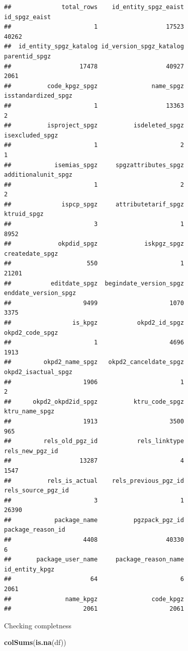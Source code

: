 \documentclass[
]{article}
\newenvironment{Shaded}{\begin{snugshade}}{\end{snugshade}}
\newcommand{\FunctionTok}[1]{\textcolor[rgb]{0.13,0.29,0.53}{\textbf{#1}}}
\newcommand{\NormalTok}[1]{#1}
\begin{document}
\begin{verbatim}
##              total_rows    id_entity_spgz_eaist           id_spgz_eaist 
##                       1                   17523                   40262 
##  id_entity_spgz_katalog id_version_spgz_katalog           parentid_spgz 
##                   17478                   40927                    2061 
##          code_kpgz_spgz               name_spgz     isstandardized_spgz 
##                       1                   13363                       2 
##          isproject_spgz          isdeleted_spgz         isexcluded_spgz 
##                       1                       2                       1 
##            isemias_spgz     spgzattributes_spgz     additionalunit_spgz 
##                       1                       2                       2 
##              ispcp_spgz     attributetarif_spgz             ktruid_spgz 
##                       3                       1                    8952 
##             okpdid_spgz             iskpgz_spgz         createdate_spgz 
##                     550                       1                   21201 
##           editdate_spgz  begindate_version_spgz    enddate_version_spgz 
##                    9499                    1070                    3375 
##                 is_kpgz           okpd2_id_spgz         okpd2_code_spgz 
##                       1                    4696                    1913 
##         okpd2_name_spgz   okpd2_canceldate_spgz     okpd2_isactual_spgz 
##                    1906                       1                       2 
##      okpd2_okpd2id_spgz          ktru_code_spgz          ktru_name_spgz 
##                    1913                    3500                     965 
##         rels_old_pgz_id           rels_linktype         rels_new_pgz_id 
##                   13287                       4                    1547 
##          rels_is_actual    rels_previous_pgz_id      rels_source_pgz_id 
##                       3                       1                   26390 
##            package_name          pgzpack_pgz_id       package_reason_id 
##                    4408                   40330                       6 
##       package_user_name     package_reason_name          id_entity_kpgz 
##                      64                       6                    2061 
##               name_kpgz               code_kpgz 
##                    2061                    2061
\end{verbatim}

Checking completness

\begin{Shaded}
\begin{Highlighting}[]
\FunctionTok{colSums}\NormalTok{(}\FunctionTok{is.na}\NormalTok{(df))}
\end{Highlighting}
\end{Shaded}
\end{document}
